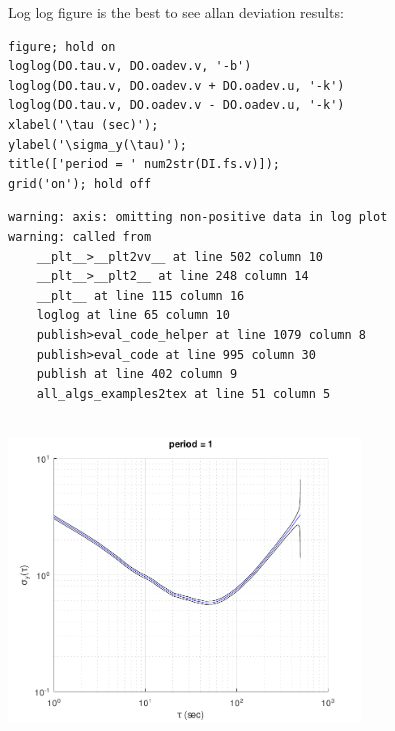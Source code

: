 Log log figure is the best to see allan deviation results:

\begin{lstlisting}
figure; hold on
loglog(DO.tau.v, DO.oadev.v, '-b')
loglog(DO.tau.v, DO.oadev.v + DO.oadev.u, '-k')
loglog(DO.tau.v, DO.oadev.v - DO.oadev.u, '-k')
xlabel('\tau (sec)');
ylabel('\sigma_y(\tau)');
title(['period = ' num2str(DI.fs.v)]);
grid('on'); hold off
\end{lstlisting}
\begin{lstlisting}[language={},xleftmargin=5pt,frame=none]
warning: axis: omitting non-positive data in log plot
warning: called from
    __plt__>__plt2vv__ at line 502 column 10
    __plt__>__plt2__ at line 248 column 14
    __plt__ at line 115 column 16
    loglog at line 65 column 10
    publish>eval_code_helper at line 1079 column 8
    publish>eval_code at line 995 column 30
    publish at line 402 column 9
    all_algs_examples2tex at line 51 column 5
 

\end{lstlisting}
\begin{center}
\includegraphics[width=0.7\textwidth]{algs_examples_published/OADEV_alg_example-1.pdf}
\end{center}


\stopcontents[localtoc]
